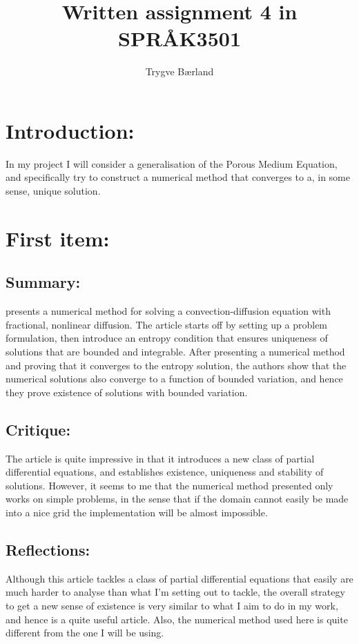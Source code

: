 \documentclass[11pt, a4paper]{article}
\begin{document}
\title{Written assignment 4 in SPRÅK3501}
\author{Trygve Bærland}
\maketitle
\section*{Introduction:}
In my project I will consider a generalisation of the Porous Medium Equation, and specifically try to construct a numerical method that converges to a, in some sense, unique solution.


\section{First item:}
\subsection{Summary:}
\cite{Cifani} presents a numerical method for solving a convection-diffusion equation with fractional, nonlinear diffusion. The article starts off by setting up a problem formulation, then introduce an entropy condition that ensures uniqueness of solutions that are bounded and integrable. After presenting a numerical method and proving that it converges to the entropy solution, the authors show that the numerical solutions also converge to a function of bounded variation, and hence they prove existence of solutions with bounded variation.

\subsection{Critique:}
The article is quite impressive in that it introduces a new class of partial differential equations, and establishes existence, uniqueness and stability of solutions. However, it seems to me that the numerical method presented only works on simple problems, in the sense that if the domain cannot easily be made into a nice grid the implementation will be almost impossible.

\subsection{Reflections:}
Although this article tackles a class of partial differential equations that easily are much harder to analyse than what I'm setting out to tackle, the overall strategy to get a new sense of existence is very similar to what I aim to do in my work, and hence is a quite useful article. Also, the numerical method used here is quite different from the one I will be using.
\end{document}
